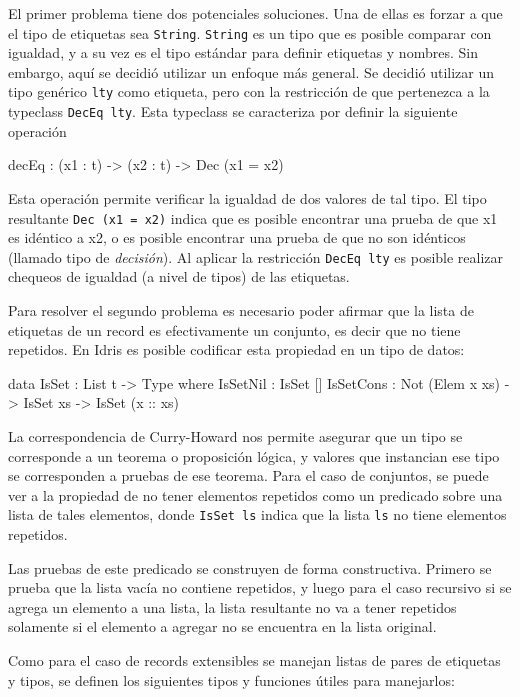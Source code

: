 El primer problema tiene dos potenciales soluciones. Una de ellas es forzar a que el tipo de etiquetas sea \texttt{String}. \texttt{String} es un tipo que es posible comparar con igualdad, y a su vez es el tipo estándar para definir etiquetas y nombres.
Sin embargo, aquí se decidió utilizar un enfoque más general. Se decidió utilizar un tipo genérico \texttt{lty} como etiqueta, pero con la restricción de que pertenezca a la typeclass \texttt{DecEq lty}. Esta typeclass se caracteriza por definir la siguiente operación

\begin{code}
decEq : (x1 : t) -> (x2 : t) -> Dec (x1 = x2)
\end{code}

Esta operación permite verificar la igualdad de dos valores de tal tipo.
El tipo resultante \texttt{Dec (x1 = x2)} indica que es posible encontrar una prueba de que x1 es idéntico a x2, o es posible encontrar una prueba de que no son idénticos (llamado tipo de \textit{decisión}). Al aplicar la restricción \texttt{DecEq lty} es posible realizar chequeos de igualdad (a nivel de tipos) de las etiquetas.

Para resolver el segundo problema es necesario poder afirmar que la lista de etiquetas de un record es efectivamente un conjunto, es decir que no tiene repetidos.
En Idris es posible codificar esta propiedad en un tipo de datos:

\begin{code}
data IsSet : List t -> Type where
  IsSetNil : IsSet []
  IsSetCons : Not (Elem x xs) -> IsSet xs -> IsSet (x :: xs)
\end{code}

La correspondencia de Curry-Howard nos permite asegurar que un tipo se corresponde a un teorema o proposición lógica, y valores que instancian ese tipo se corresponden a pruebas de ese teorema.
Para el caso de conjuntos, se puede ver a la propiedad de no tener elementos repetidos como un predicado sobre una lista de tales elementos, donde \texttt{IsSet ls} indica que la lista \texttt{ls} no tiene elementos repetidos.

Las pruebas de este predicado se construyen de forma constructiva. Primero se prueba que la lista vacía no contiene repetidos, y luego para el caso recursivo si se agrega un elemento a una lista, la lista resultante no va a tener repetidos solamente si el elemento a agregar no se encuentra en la lista original.

Como para el caso de records extensibles se manejan listas de pares de etiquetas y tipos, se definen los siguientes tipos y funciones útiles para manejarlos:

